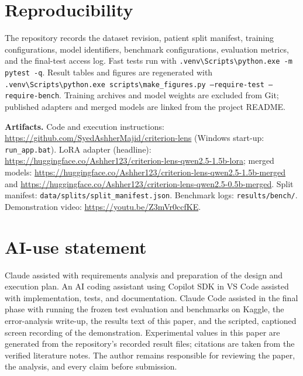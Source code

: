 \section{Reproducibility}
The repository records the dataset revision, patient split manifest, training configurations, model identifiers, benchmark configurations, evaluation metrics, and the final-test access log. Fast tests run with \texttt{.venv\textbackslash Scripts\textbackslash python.exe -m pytest -q}. Result tables and figures are regenerated with \texttt{.venv\textbackslash Scripts\textbackslash python.exe scripts\textbackslash make\_figures.py --require-test --require-bench}. Training archives and model weights are excluded from Git; published adapters and merged models are linked from the project README.

\noindent\textbf{Artifacts.} Code and execution instructions: \url{https://github.com/SyedAshherMajid/criterion-lens} (Windows start-up: \texttt{run\_app.bat}). LoRA adapter (headline): \url{https://huggingface.co/Ashher123/criterion-lens-qwen2.5-1.5b-lora}; merged models: \url{https://huggingface.co/Ashher123/criterion-lens-qwen2.5-1.5b-merged} and \url{https://huggingface.co/Ashher123/criterion-lens-qwen2.5-0.5b-merged}. Split manifest: \texttt{data/splits/split\_manifest.json}. Benchmark logs: \texttt{results/bench/}. Demonstration video: \url{https://youtu.be/Z3mVr0ccfKE}.

\section{AI-use statement}
Claude assisted with requirements analysis and preparation of the design and execution plan. An AI coding assistant using Copilot SDK in VS Code assisted with implementation, tests, and documentation. Claude Code assisted in the final phase with running the frozen test evaluation and benchmarks on Kaggle, the error-analysis write-up, the results text of this paper, and the scripted, captioned screen recording of the demonstration. Experimental values in this paper are generated from the repository's recorded result files; citations are taken from the verified literature notes. The author remains responsible for reviewing the paper, the analysis, and every claim before submission.
